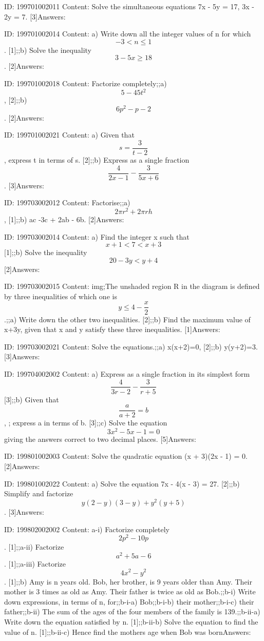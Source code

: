 \documentclass{article}
\begin{document}
ID: 199701002011
Content:
Solve the simultaneous equations 7x - 5y = 17, 3x - 2y = 7. [3]Answers:

ID: 199701002014
Content:
a) Write down all the integer values of n for which $$-3 < n \leq 1$$. [1];;b) Solve the inequality $$3-5x \geq 18$$. [2]Answers:

ID: 199701002018
Content:
Factorize completely;;a) $$5-45t^2$$, [2];;b) $$6p^2-p-2$$. [2]Answers:

ID: 199701002021
Content:
a) Given that $$s=\frac{3}{t-2}$$, express t in terms of s. [2];;b) Express as a single fraction $$\frac{4}{2x-1}-\frac{3}{5x+6}$$. [3]Answers:

ID: 199703002012
Content:
Factorise;;a) $$2\pi r^2+2\pi rh$$, [1];;b) ac -3c + 2ab - 6b. [2]Answers:

ID: 199703002014
Content:
a) Find the integer x such that $$x+1<7<x+3$$ [1];;b) Solve the inequality $$20-3y < y+4$$ [2]Answers:

ID: 199703002015
Content:
img;The unshaded region R in the diagram is defined by three inequalities of which one is $$y\leq 4-\frac{x}{2}$$.;;a) Write down the other two inequalities. [2];;b) Find the maximum value of x+3y, given that x and y satisfy these three inequalities. [1]Answers:

ID: 199703002021
Content:
Solve the equations.;;a) x(x+2)=0, [2];;b) y(y+2)=3. [3]Answers:

ID: 199704002002
Content:
a) Express as a single fraction in its simplest form $$\frac{4}{3r - 2} - \frac{3}{r + 5}$$ [3];;b) Given that $$\frac{a}{a + 2} = b$$, ; express a in terms of b. [3];;c) Solve the equation $$3x^2 - 5x - 1 = 0$$ giving the answers correct to two decimal places.  [5]Answers:

ID: 199801002003
Content:
Solve the quadratic equation (x + 3)(2x - 1) = 0. [2]Answers:

ID: 199801002022
Content:
a) Solve the equation 7x - 4(x - 3) = 27. [2];;b) Simplify and factorize $$y(2-y)(3-y)+y^2(y+5)$$. [3]Answers:

ID: 199802002002
Content:
a-i) Factorize completely $$2p^2-10p$$. [1];;a-ii) Factorize $$a^2+5a-6$$. [1];;a-iii) Factorize $$4x^{2} -y^{2} $$. [1];;b) Amy is n years old. Bob, her brother, is 9 years older than Amy. Their mother is 3 times as old as Amy. Their father is twice as old as Bob.;;b-i) Write down expressions, in terms of n, for;;b-i-a) Bob;;b-i-b) their mother;;b-i-c) their father;;b-ii) The sum of the ages of the four members of the family is 139.;;b-ii-a) Write down the equation satisfied by n. [1];;b-ii-b) Solve the equation to find the value of n. [1];;b-ii-c) Hence find the mothers age when Bob was bornAnswers:
\end{document}
